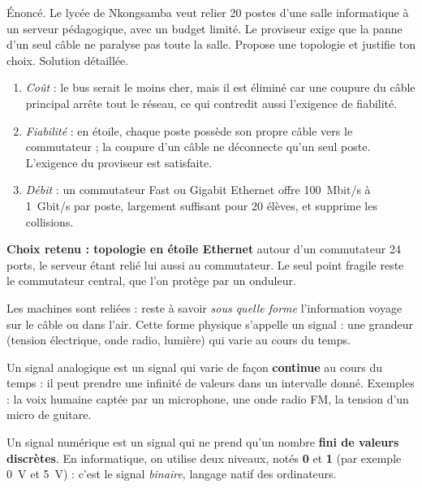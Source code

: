 \documentclass[11pt]{article}
\newcommand{\cle}[1]{{\popxbold\color{popdark}#1}}
\newcounter{popsec}
\newcounter{popsub}
\newcommand{\courssub}[1]{%
  \stepcounter{popsub}%
  \par\vspace{9pt}\noindent{\popxbold\fontsize{11.5}{13}\selectfont\color{popink}{\color{poporange}\thepopsec.\thepopsub}\hspace{6pt}#1}\par\nopagebreak\vspace{4pt}
}
\begin{document}
\begin{exoresolu}
Énoncé. Le lycée de Nkongsamba veut relier 20 postes d'une salle informatique à un serveur pédagogique, avec un budget limité. Le proviseur exige que la panne d'un seul câble ne paralyse pas toute la salle. Propose une topologie et justifie ton choix.
\tcblower
Solution détaillée.
\begin{enumerate}
\item \emph{Coût} : le bus serait le moins cher, mais il est éliminé car une coupure du câble principal arrête tout le réseau, ce qui contredit aussi l'exigence de fiabilité.
\item \emph{Fiabilité} : en étoile, chaque poste possède son propre câble vers le commutateur ; la coupure d'un câble ne déconnecte qu'un seul poste. L'exigence du proviseur est satisfaite.
\item \emph{Débit} : un commutateur Fast ou Gigabit Ethernet offre \SI{100}{Mbit/s} à \SI{1}{Gbit/s} par poste, largement suffisant pour 20 élèves, et supprime les collisions.
\end{enumerate}
\textbf{Choix retenu : topologie en étoile Ethernet} autour d'un commutateur 24 ports, le serveur étant relié lui aussi au commutateur. Le seul point fragile reste le commutateur central, que l'on protège par un onduleur.
\end{exoresolu}

\courssub{Signaux analogiques et numériques}

Les machines sont reliées : reste à savoir \emph{sous quelle forme} l'information voyage sur le câble ou dans l'air. Cette forme physique s'appelle un \cle{signal} : une grandeur (tension électrique, onde radio, lumière) qui varie au cours du temps.

\begin{definition}
Un \cle{signal analogique} est un signal qui varie de façon \textbf{continue} au cours du temps : il peut prendre une infinité de valeurs dans un intervalle donné. Exemples : la voix humaine captée par un microphone, une onde radio FM, la tension d'un micro de guitare.
\end{definition}

\begin{definition}
Un \cle{signal numérique} est un signal qui ne prend qu'un nombre \textbf{fini de valeurs discrètes}. En informatique, on utilise deux niveaux, notés \textbf{0} et \textbf{1} (par exemple \SI{0}{V} et \SI{5}{V}) : c'est le signal \emph{binaire}, langage natif des ordinateurs.
\end{definition}
\end{document}
